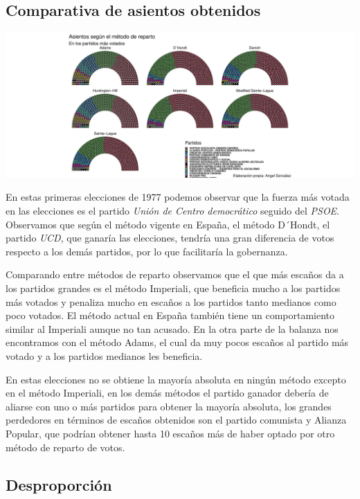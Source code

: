 \documentclass[12pt,a4paper,]{book}
\numberwithin{dummy}{section}
\theoremstyle{ocrenumbox}
\theoremstyle{blacknumex}
\theoremstyle{blacknumbox}
\theoremstyle{ocrenum}
\theoremstyle{ocrenum}
\begin{document}
\hypertarget{comparativa-de-asientos-obtenidos}{%
\subsection{Comparativa de asientos
obtenidos}\label{comparativa-de-asientos-obtenidos}}

\begin{center}\includegraphics[width=1\linewidth]{figurasR/unnamed-chunk-78-1} \end{center}

En estas primeras elecciones de 1977 podemos observar que la fuerza más
votada en las elecciones es el partido \emph{Unión de Centro
democrático} seguido del \emph{PSOE}. Observamos que según el método
vigente en España, el método D´Hondt, el partido \emph{UCD}, que ganaría
las elecciones, tendría una gran diferencia de votos respecto a los
demás partidos, por lo que facilitaría la gobernanza.

Comparando entre métodos de reparto observamos que el que más escaños da
a los partidos grandes es el método Imperiali, que beneficia mucho a los
partidos más votados y penaliza mucho en escaños a los partidos tanto
medianos como poco votados. El método actual en España también tiene un
comportamiento similar al Imperiali aunque no tan acusado. En la otra
parte de la balanza nos encontramos con el método Adams, el cual da muy
pocos escaños al partido más votado y a los partidos medianos les
beneficia.

En estas elecciones no se obtiene la mayoría absoluta en ningún método
excepto en el método Imperiali, en los demás métodos el partido ganador
debería de aliarse con uno o más partidos para obtener la mayoría
absoluta, los grandes perdedores en términos de escaños obtenidos son el
partido comunista y Alianza Popular, que podrían obtener hasta 10
escaños más de haber optado por otro método de reparto de votos.

\hypertarget{desproporciuxf3n}{%
\subsection{Desproporción}\label{desproporciuxf3n}}
\end{document}
